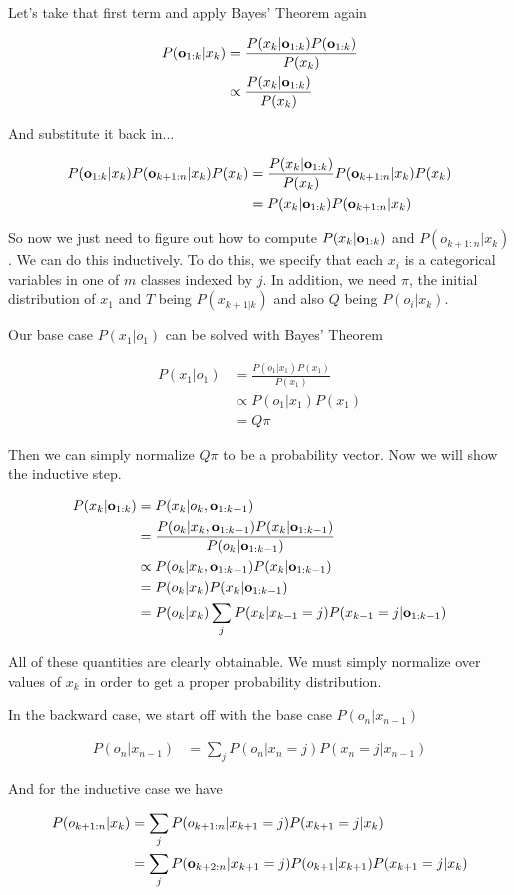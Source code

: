 \documentclass[12pt]{article}
\newcommand{\eq}[1]{\begin{align*}#1\end{align*}}
\begin{document}
Let's take that first term and apply Bayes' Theorem again

\eq{
  P(\o_{1:k}|x_k) &= \frac{P(x_k | \o_{1:k}) P(\o_{1:k})}{P(x_k)} \\
  &\propto \frac{P(x_k | \o_{1:k})}{P(x_k)}
}

And substitute it back in...

\eq{
  P(\o_{1:k}|x_k)P(\o_{k+1:n}|x_k)P(x_k) &= \frac{P(x_k|\o_{1:k})}{P(x_k)}P(\o_{k+1:n}|x_k)P(x_k) \\
  &= P(x_k|\o_{1:k})P(\o_{k+1:n}|x_k)
}

So now we just need to figure out how to compute $P(x_k|\mathbf{o}_{1:k})$ and $P(o_{k+1:n}|x_k)$. We can do this inductively. To do this, we specify that each $x_i$ is a categorical variables in one of $m$ classes indexed by $j$. In addition, we need $\pi$, the initial distribution of $x_1$ and $T$ being $P(x_{k+1|k})$ and also $Q$ being $P(o_i|x_k)$. 

Our base case $P(x_1|o_1)$ can be solved with Bayes' Theorem

\eq{
  P(x_1|o_1) &= \frac{P(o_1|x_1)P(x_1)}{P(x_1)} \\
  &\propto P(o_1|x_1)P(x_1) \\
  &= Q\pi
}

Then we can simply normalize $Q\pi$ to be a probability vector. Now we will show the inductive step.

\eq{
  P(x_k|\o_{1:k}) &= P(x_k|o_k,\o_{1:k-1}) \\
  &= \frac{P(o_k|x_k,\o_{1:k-1})P(x_k|\o_{1:k-1})}{P(o_k|\o_{1:k-1})} \\
  &\propto P(o_k|x_k,\o_{1:k-1})P(x_k|\o_{1:k-1}) \\
  &= P(o_k|x_k)P(x_k|\o_{1:k-1}) \\
  &= P(o_k|x_k) \sum_j P(x_k|x_{k-1} = j)P(x_{k-1}=j|\o_{1:k-1}) \\
}

All of these quantities are clearly obtainable. We must simply normalize over values of $x_k$ in order to get a proper probability distribution.

In the backward case, we start off with the base case $P(o_n|x_{n-1})$

\eq{
  P(o_n|x_{n-1}) &= \sum_j P(o_n|x_n = j)P(x_n=j|x_{n-1})
}

And for the inductive case we have

\eq{
  P(o_{k+1:n}|x_k) &= \sum_j P(o_{k+1:n}|x_{k+1}=j)P(x_{k+1}=j|x_k) \\
  &= \sum_j P(\o_{k+2:n}|x_{k+1}=j)P(o_{k+1}|x_{k+1})P(x_{k+1}=j|x_k) \\
}
\end{document}
